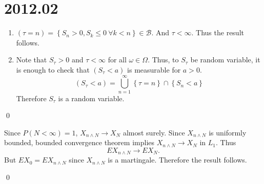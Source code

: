 \section{2012.02}

\begin{problem} \hfill
	\begin{enumerate}[label = (\alph*)]
		\item $(\tau = n) = \left\{ S_n > 0, S_k \leq 0 \  \forall k < n \right\} \in \mathcal{B}$.
			And $\tau < \infty$. Thus the result follows.

		\item Note that $S_\tau > 0 $ and $\tau < \infty$ for all $\omega \in \Omega$.
			Thus, to $S_\tau$ be random variable, it is enough to check that $(S_\tau < a)$ is measurable for $a>0$.
			\[
				(S_\tau < a) = \bigcup_{n=1}^\infty \left\{ \tau = n \right\} \cap \left\{ S_n <a \right\}
			\]
			Therefore $S_\tau$ is a random variable.
	\end{enumerate}

	\qed

\end{problem}
\begin{problem} \hfill

	Since $P(N <\infty) = 1$, $X_{n\wedge N} \rightarrow X_N$ almost surely.
	Since $X_{n \wedge N}$ is uniformly bounded, bounded convergence theorem implies $X_{n \wedge N} \rightarrow X_N$ in $L_1$.
	Thus
	\[
		EX_{n \wedge N} \rightarrow EX_N.
	\]
	But $EX_0 = EX_{n\wedge N}$ since $X_{n\wedge N}$ is a martingale.
	Therefore the result follows.

	\qed

\end{problem}

